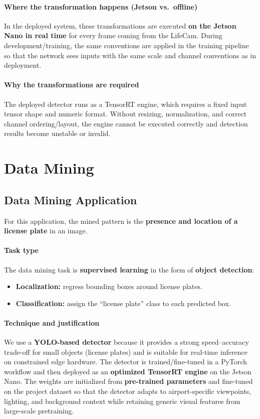 \paragraph{Where the transformation happens (Jetson vs.\ offline)}
In the deployed system, these transformations are executed \textbf{on the Jetson Nano in real time} for every frame coming from the LifeCam. During development/training, the same conventions are applied in the training pipeline so that the network sees inputs with the same scale and channel conventions as in deployment.

\paragraph{Why the transformations are required}
The deployed detector runs as a TensorRT engine, which requires a fixed input tensor shape and numeric format. Without resizing, normalization, and correct channel ordering/layout, the engine cannot be executed correctly and detection results become unstable or invalid.

\section{Data Mining}
\label{subsec:kdd_data_mining}

\subsection{Data Mining Application}
\label{subsec:kdd_hyperparameters}

For this application, the mined pattern is the \textbf{presence and location of a license plate} in an image.

\paragraph{Task type}
The data mining task is \textbf{supervised learning} in the form of \textbf{object detection}:
\begin{itemize}
	\item \textbf{Localization:} regress bounding boxes around license plates.
	\item \textbf{Classification:} assign the ``license plate'' class to each predicted box.
\end{itemize}

\paragraph{Technique and justification}
We use a \textbf{YOLO-based detector} because it provides a strong speed--accuracy trade-off for small objects (license plates) and is suitable for real-time inference on constrained edge hardware. The detector is trained/fine-tuned in a PyTorch workflow and then deployed as an \textbf{optimized TensorRT engine} on the Jetson Nano. The weights are initialized from \textbf{pre-trained parameters} and fine-tuned on the project dataset so that the detector adapts to airport-specific viewpoints, lighting, and background context while retaining generic visual features from large-scale pretraining.

